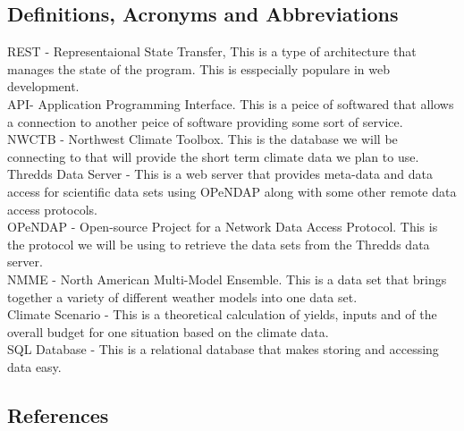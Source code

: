 \documentclass[onecolumn, draftclsnofoot,10pt, compsoc]{article}
\begin{document}
		\subsection{Definitions, Acronyms and Abbreviations}
			REST - Representaional State Transfer, This is a type of architecture that manages the state of the program. This is esspecially populare in web development.\\
			API- Application Programming Interface. This is a peice of softwared that allows a connection to another peice of software providing some sort of service.\\
			NWCTB - Northwest Climate Toolbox. This is the database we will be connecting to that will provide the short term climate data we plan to use.\\
			Thredds Data Server - This is a web server that provides meta-data and data access for scientific data sets using OPeNDAP along with some other remote data access protocols.\\
			OPeNDAP - Open-source Project for a Network Data Access Protocol. This is the protocol we will be using to retrieve the data sets from the Thredds data server.\\
			NMME - North American Multi-Model Ensemble. This is a data set that brings together a variety of different weather models into one data set.\\
			Climate Scenario - This is a theoretical calculation of yields, inputs and of the overall budget for one situation based on the climate data.\\
			SQL Database - This is a relational database that makes storing and accessing data easy.\\
			

			\renewcommand\refname{\vskip -1cm}
		\subsection{References}

		\nocite{*}
    
    
\end{document}
